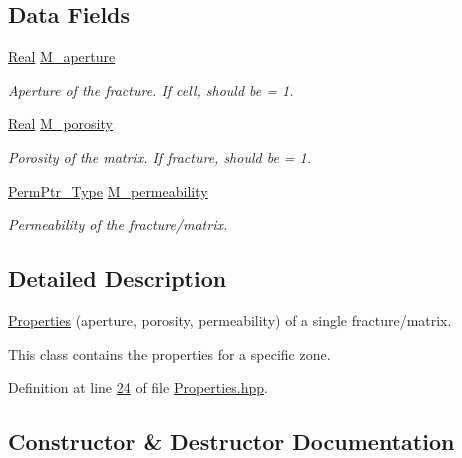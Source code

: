 \subsection*{Data Fields}
\begin{DoxyCompactItemize}
\item 
\hyperlink{namespaceFVCode3D_a40c1f5588a248569d80aa5f867080e83}{Real} \hyperlink{classFVCode3D_1_1Properties_ace95facc126d88b414622cdb0e4fc835}{M\+\_\+aperture}
\begin{DoxyCompactList}\small\item\em Aperture of the fracture. If cell, should be = 1. \end{DoxyCompactList}\item 
\hyperlink{namespaceFVCode3D_a40c1f5588a248569d80aa5f867080e83}{Real} \hyperlink{classFVCode3D_1_1Properties_a22632d3f1cb4769e409c6d3bc84893d8}{M\+\_\+porosity}
\begin{DoxyCompactList}\small\item\em Porosity of the matrix. If fracture, should be = 1. \end{DoxyCompactList}\item 
\hyperlink{namespaceFVCode3D_aee5ae48a57366603109f90f526a645b1}{Perm\+Ptr\+\_\+\+Type} \hyperlink{classFVCode3D_1_1Properties_a0689b2e6e4e5cb23ba4553ac78abe2bd}{M\+\_\+permeability}
\begin{DoxyCompactList}\small\item\em Permeability of the fracture/matrix. \end{DoxyCompactList}\end{DoxyCompactItemize}


\subsection{Detailed Description}
\hyperlink{classFVCode3D_1_1Properties}{Properties} (aperture, porosity, permeability) of a single fracture/matrix. 

This class contains the properties for a specific zone. 

Definition at line \hyperlink{Properties_8hpp_source_l00024}{24} of file \hyperlink{Properties_8hpp_source}{Properties.\+hpp}.



\subsection{Constructor \& Destructor Documentation}
